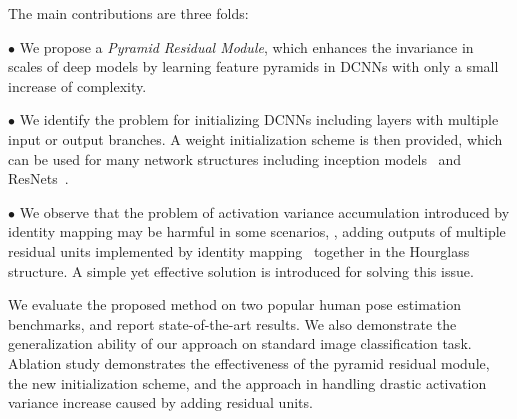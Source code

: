 \documentclass[10pt,twocolumn,letterpaper]{article}
\newenvironment{myitemize}[1][]{
\begin{list}{{#1}} 
	{
		\setlength{\leftmargin}{1.2em}
		\setlength{\topsep}{0em}
		\setlength{\itemsep}{-0.2em}
}}
{\end{list}}
\begin{document}
The main contributions are three folds:
\begin{myitemize}
	\item[$\bullet$] We propose a \textit{Pyramid Residual Module}, which enhances the invariance in scales of deep models by learning feature pyramids in DCNNs with only a small increase of complexity.
	\item[$\bullet$] We identify the problem for initializing DCNNs including layers with multiple input or output branches. A weight initialization scheme is then provided, which can be used for many network structures including inception models~\cite{szegedy2015going,ioffe2015batch,szegedy2016rethinking,szegedy2016inception} and ResNets~\cite{he2016deep,he2016identity}.
	\item[$\bullet$] We observe that the problem of activation variance accumulation introduced by identity mapping may be harmful in some scenarios, \eg, adding outputs of multiple residual units implemented by identity mapping~\cite{he2016identity} together in the Hourglass structure. A simple yet effective solution is introduced for solving this issue. 
\end{myitemize}
We evaluate the proposed method on two popular human pose estimation benchmarks, and report state-of-the-art results. 
We also demonstrate the generalization ability of our approach on standard image classification task. 
Ablation study demonstrates the effectiveness of the pyramid residual module, the new initialization scheme, and the approach in handling drastic activation variance increase caused by adding residual units.




\end{document}
